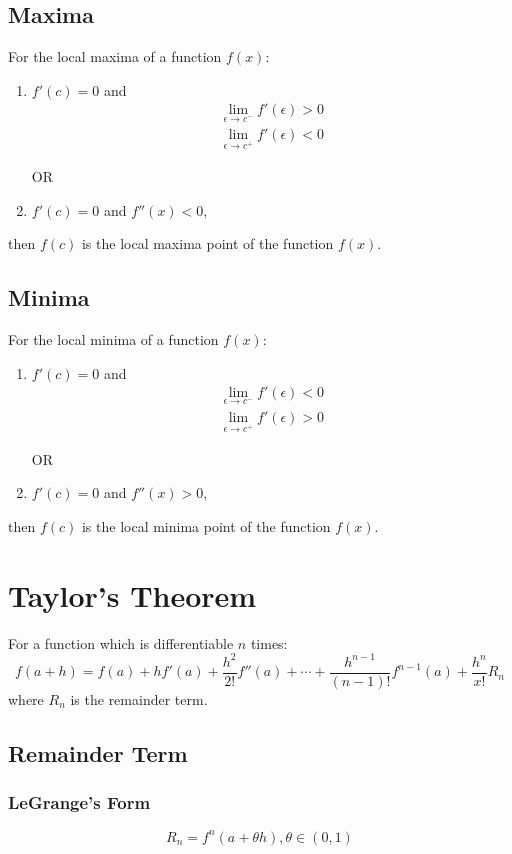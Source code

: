 \subsection{Maxima}
For the local maxima of a function $f(x)$:
\begin{enumerate}
	\item $f'(c)=0$ and
	\begin{align}
		\lim_{\epsilon\to c^{-}} f'(\epsilon)>0\nonumber\\
		\lim_{\epsilon\to c^{+}} f'(\epsilon)<0\nonumber
	\end{align}
	\begin{center}
		OR
	\end{center}
	\item $f'(c)=0$ and $f''(x)<0$,
\end{enumerate}
then $f(c)$ is the local maxima point of the function $f(x)$.

\subsection{Minima}
For the local minima of a function $f(x)$:
\begin{enumerate}
	\item $f'(c)=0$ and
	\begin{align}
		\lim_{\epsilon\to c^{-}} f'(\epsilon)<0\nonumber\\
		\lim_{\epsilon\to c^{+}} f'(\epsilon)>0\nonumber
	\end{align}
	\begin{center}
		OR
	\end{center}
	\item $f'(c)=0$ and $f''(x)>0$,
\end{enumerate}
then $f(c)$ is the local minima point of the function $f(x)$.

\section{Taylor's Theorem}
For a function which is differentiable $n$ times:
\begin{equation}
	f(a+h)=f(a)+hf'(a)+\dfrac{h^2}{2!}f''(a)+\cdots+\dfrac{h^{n-1}}{(n-1)!} f^{n-1}(a)+\dfrac{h^n}{x!}R_n
\end{equation}
where $R_n$ is the remainder term.
\subsection{Remainder Term}
\subsubsection{LeGrange's Form}
\begin{equation}
	R_n=f^n (a+\theta h), \theta \in (0,1)
\end{equation}
